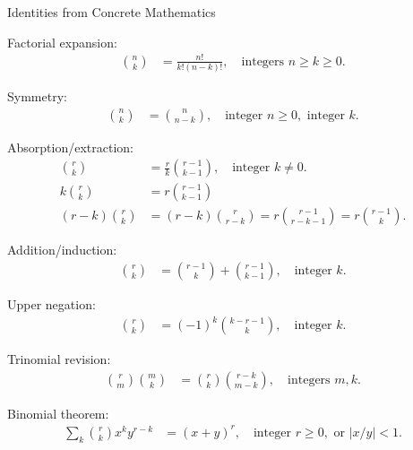 Identities from Concrete Mathematics~\cite[p. 174]{graham1994concrete}
\begin{identity}
    Factorial expansion:
    \begin{align*}
        \binom{n}{k} &= \frac{n!}{k!(n-k)!}, \quad \text{integers } n \geq k \geq 0.
    \end{align*}
\end{identity}

\begin{identity}
    Symmetry:
    \begin{align*}
        \binom{n}{k} &= \binom{n}{n-k}, \quad \text{integer } n \geq 0, \text{ integer } k.
    \end{align*}
\end{identity}

\begin{identity}
    Absorption/extraction:
    \begin{align*}
        \binom{r}{k} &= \frac{r}{k} \binom{r-1}{k-1}, \quad \text{integer } k \neq 0. \\
        k \binom{r}{k} &= r \binom{r-1}{k-1} \\
        (r-k) \binom{r}{k} &= (r-k) \binom{r}{r-k} = r \binom{r-1}{r-k-1} = r \binom{r-1}{k}.
    \end{align*}
\end{identity}

\begin{identity}
    Addition/induction:
    \begin{align*}
        \binom{r}{k} &= \binom{r-1}{k} + \binom{r-1}{k-1}, \quad \text{integer } k.
    \end{align*}
\end{identity}

\begin{identity}
    Upper negation:
    \begin{align*}
        \binom{r}{k} &= (-1)^k \binom{k - r - 1}{k}, \quad \text{integer } k.
    \end{align*}
\end{identity}

\begin{identity}
    Trinomial revision:
    \begin{align*}
        \binom{r}{m} \binom{m}{k} &= \binom{r}{k} \binom{r - k}{m - k}, \quad \text{integers } m, k.
    \end{align*}
\end{identity}

\begin{identity}
    Binomial theorem:
    \begin{align*}
        \sum_{k} \binom{r}{k} x^k y^{r-k} &= (x + y)^r, \quad \text{integer } r \geq 0, \text{ or } |x/y| < 1.
    \end{align*}
\end{identity}

